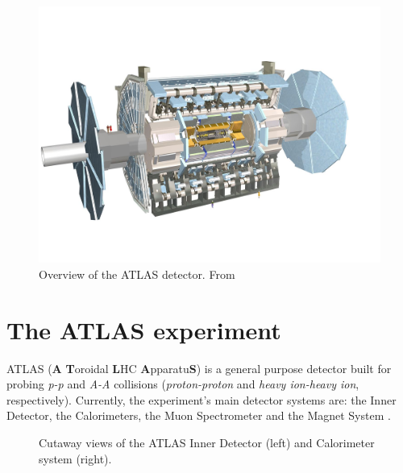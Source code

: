 \begin{figure}[!ht]
    \centering
    \includegraphics[width=.7\textwidth]{Images/intro/ATLAS_detector.jpg}
    \captionsetup{width=.8\linewidth}
    \caption{Overview of the ATLAS detector. From \cite{atlasDetectorTechnology}}
    \label{fig:ATLAS}
\end{figure}


\section{The ATLAS experiment}%

ATLAS (\textbf{A} \textbf{T}oroidal \textbf{L}HC \textbf{A}pparatu\textbf{S}) is a general purpose detector built for probing \textit{p-p} and \textit{A-A} collisions (\textit{proton-proton} and \textit{heavy ion-heavy ion}, respectively). Currently, the experiment's main detector systems are: the Inner Detector, the Calorimeters, the Muon Spectrometer and the Magnet System \cite{Collaboration_The_ATLAS2008}. 

\begin{figure}[ht]
    \centering
    \hfill
    \centering
    \caption{Cutaway views of the ATLAS Inner Detector (left) and Calorimeter system (right).}
\end{figure}


